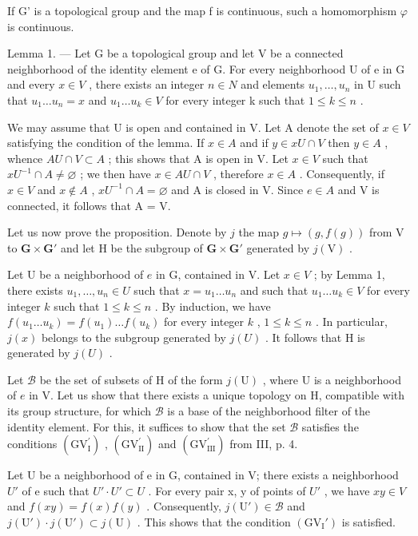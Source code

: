 If G' is a topological group and the map f is continuous, such a homomorphism \(\varphi\) is continuous.

Lemma 1. — Let G be a topological group and let V be a connected neighborhood of the identity element e of G. For every neighborhood U of e in G and every \(x \in V\) , there exists an integer \(n \in N\) and elements \(u_{1}, \ldots, u_{n}\) in U such that \(u_{1} \ldots u_{n} = x\) and \(u_{1} \ldots u_{k} \in V\) for every integer k such that \(1 \leqslant k \leqslant n\) .

We may assume that U is open and contained in V. Let A denote the set of \(x \in V\) satisfying the condition of the lemma. If \(x \in A\) and if \(y \in xU \cap V\) then \(y \in A\) , whence \(AU \cap V \subset A\) ; this shows that A is open in V. Let \(x \in V\) such that \(xU^{-1} \cap A \neq \varnothing\) ; we then have \(x \in AU \cap V\) , therefore \(x \in A\) . Consequently, if \(x \in V\) and \(x \notin A\) , \(xU^{-1} \cap A = \varnothing\) and A is closed in V. Since \(e \in A\) and V is connected, it follows that A = V.

Let us now prove the proposition. Denote by \(j\) the map \(g \mapsto (g, f(g))\) from V to \(\mathbf{G} \times \mathbf{G}'\) and let H be the subgroup of \(\mathbf{G} \times \mathbf{G}'\) generated by \(j(\mathrm{V})\) .

Let U be a neighborhood of \(e\) in G, contained in V. Let \(x \in V\) ; by Lemma 1, there exists \(u_1, \ldots, u_n \in U\) such that \(x = u_1 \ldots u_n\) and such that \(u_1 \ldots u_k \in V\) for every integer \(k\) such that \(1 \leqslant k \leqslant n\) . By induction, we have \(f(u_1 \ldots u_k) = f(u_1) \ldots f(u_k)\) for every integer \(k\) , \(1 \leqslant k \leqslant n\) . In particular, \(j(x)\) belongs to the subgroup generated by \(j(U)\) . It follows that H is generated by \(j(U)\) .

Let \(\mathcal{B}\) be the set of subsets of H of the form \(j(\mathrm{U})\) , where U is a neighborhood of \(e\) in V. Let us show that there exists a unique topology on H, compatible with its group structure, for which \(\mathcal{B}\) is a base of the neighborhood filter of the identity element. For this, it suffices to show that the set \(\mathcal{B}\) satisfies the conditions \((\mathrm{GV}_{\mathrm{I}}^{\prime})\) , \((\mathrm{GV}_{\mathrm{II}}^{\prime})\) and \((\mathrm{GV}_{\mathrm{III}}^{\prime})\) from III, p. 4.

Let U be a neighborhood of e in G, contained in V; there exists a neighborhood \(U'\) of e such that \(U' \cdot U' \subset U\) . For every pair x, y of points of \(U'\) , we have \(xy \in V\) and \(f(xy) = f(x)f(y)\) . Consequently, \(j(\mathrm{U}') \in \mathcal{B}\) and \(j(\mathrm{U}') \cdot j(\mathrm{U}') \subset j(\mathrm{U})\) . This shows that the condition \((\mathrm{GV}_{\mathrm{I}}')\) is satisfied.

